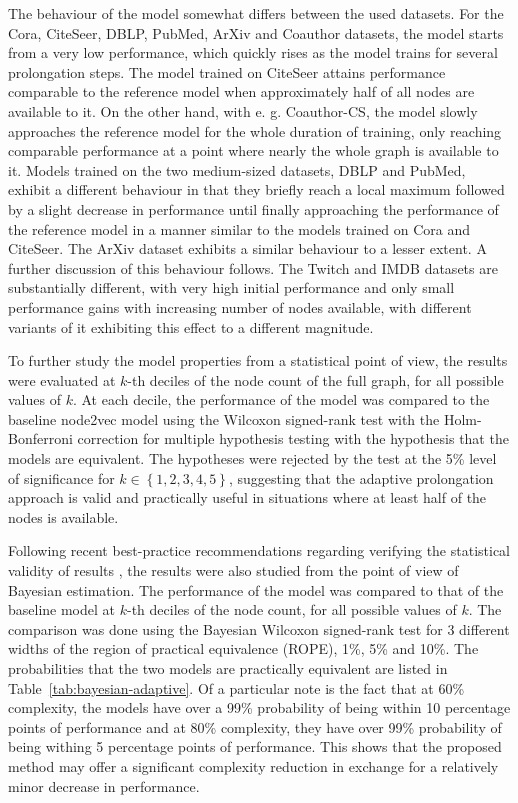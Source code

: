 The behaviour of the model somewhat differs between the used datasets. For the Cora, CiteSeer, DBLP, PubMed, ArXiv and Coauthor datasets, the model starts from a very low performance, which quickly rises as the model trains for several prolongation steps. The model trained on CiteSeer attains performance comparable to the reference model when approximately half of all nodes are available to it. On the other hand, with e. g. Coauthor-CS, the model slowly approaches the reference model for the whole duration of training, only reaching comparable performance at a point where nearly the whole graph is available to it. Models trained on the two medium-sized datasets, DBLP and PubMed, exhibit a different behaviour in that they briefly reach a local maximum followed by a slight decrease in performance until finally approaching the performance of the reference model in a manner similar to the models trained on Cora and CiteSeer. The ArXiv dataset exhibits a similar behaviour to a lesser extent. A further discussion of this behaviour follows. The Twitch and IMDB datasets are substantially different, with very high initial performance and only small performance gains with increasing number of nodes available, with different variants of it exhibiting this effect to a different magnitude.

To further study the model properties from a statistical point of view, the results were evaluated at \( k \)-th deciles of the node count of the full graph, for all possible values of \( k \). At each decile, the performance of the model was compared to the baseline node2vec model using the Wilcoxon signed-rank test with the Holm-Bonferroni correction for multiple hypothesis testing with the hypothesis that the models are equivalent. The hypotheses were rejected by the test at the 5\% level of significance for \( k \in \left\{ 1, 2, 3, 4, 5 \right\} \), suggesting that the adaptive prolongation approach is valid and practically useful in situations where at least half of the nodes is available.

Following recent best-practice recommendations regarding verifying the statistical validity of results \cite{benavoli_time_2017}, the results were also studied from the point of view of Bayesian estimation. The performance of the model was compared to that of the baseline model at \( k \)-th deciles of the node count, for all possible values of \( k \). The comparison was done using the Bayesian Wilcoxon signed-rank test \cite{benavoli_bayesian_2014} for 3 different widths of the region of practical equivalence (ROPE), 1\%, 5\% and 10\%. The probabilities that the two models are practically equivalent are listed in Table~\ref{tab:bayesian-adaptive}. Of a particular note is the fact that  at 60\% complexity, the models have over a 99\% probability of being within 10 percentage points of performance and at 80\% complexity, they have over 99\% probability of being withing 5 percentage points of performance. This shows that the proposed method may offer a significant complexity reduction in exchange for a relatively minor decrease in performance.

